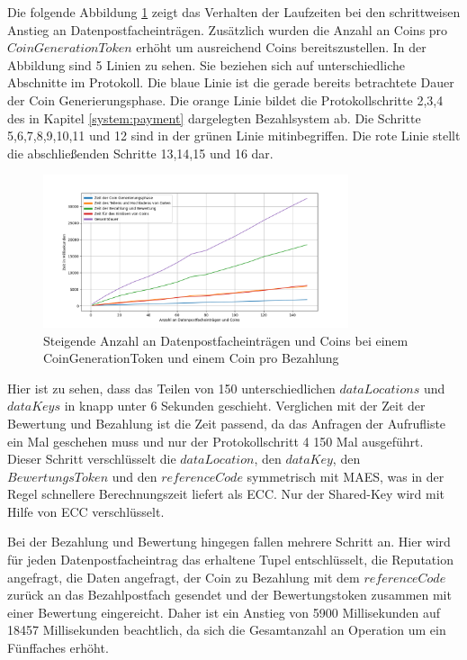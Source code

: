 \documentclass{scrreprt}
\begin{document}
Die folgende Abbildung \ref{fig:win_3} zeigt das Verhalten der Laufzeiten bei den schrittweisen Anstieg an Datenpostfacheinträgen. Zusätzlich wurden die Anzahl an Coins pro $CoinGenerationToken$ erhöht um ausreichend Coins bereitszustellen. In der Abbildung sind 5 Linien zu sehen. Sie beziehen sich auf unterschiedliche Abschnitte im Protokoll. Die blaue Linie ist die gerade bereits betrachtete Dauer der Coin Generierungsphase. Die orange Linie bildet die Protokollschritte 2,3,4 des in Kapitel \ref{system:payment} dargelegten Bezahlsystem ab. Die Schritte 5,6,7,8,9,10,11 und 12 sind in der grünen Linie mitinbegriffen. Die rote Linie stellt die abschließenden Schritte 13,14,15 und 16 dar.
\begin{figure}[H]
    \caption{Steigende Anzahl an Datenpostfacheinträgen und Coins bei einem CoinGenerationToken und einem Coin pro Bezahlung}
    \label{fig:win_3}
    \centering
    \includegraphics[width=0.8\textwidth]{figure_win_3.png}
\end{figure}
Hier ist zu sehen, dass das Teilen von 150 unterschiedlichen $dataLocations$ und $dataKeys$ in knapp unter 6 Sekunden geschieht. Verglichen mit der Zeit der Bewertung und Bezahlung ist die Zeit passend, da das Anfragen der Aufrufliste ein Mal geschehen muss und nur der Protokollschritt 4 150 Mal ausgeführt. Dieser Schritt verschlüsselt die $dataLocation$, den $dataKey$, den $BewertungsToken$ und den $referenceCode$ symmetrisch mit MAES, was in der Regel schnellere Berechnungszeit liefert als ECC. Nur der Shared-Key wird mit Hilfe von ECC verschlüsselt. 

Bei der Bezahlung und Bewertung hingegen fallen mehrere Schritt an. Hier wird für jeden Datenpostfacheintrag das erhaltene Tupel entschlüsselt, die Reputation angefragt, die Daten angefragt, der Coin zu Bezahlung mit dem $referenceCode$ zurück an das Bezahlpostfach gesendet und der Bewertungstoken zusammen mit einer Bewertung eingereicht. Daher ist ein Anstieg von 5900 Millisekunden auf 18457 Millisekunden beachtlich, da sich die Gesamtanzahl an Operation um ein Fünffaches erhöht. 
\end{document}

